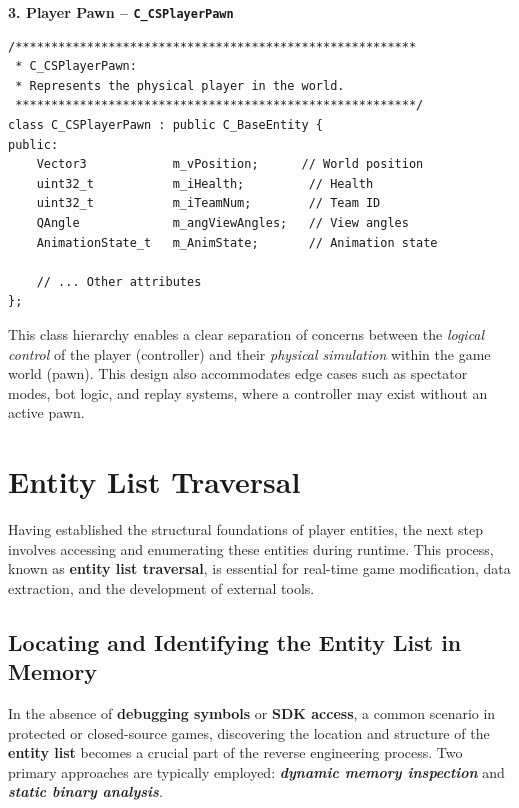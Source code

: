 \noindent\textbf{3. Player Pawn – \texttt{C\_CSPlayerPawn}}

\begin{lstlisting}[style=cppstyle, caption={C\_CSPlayerPawn – In-World Representation of the Player}]
/********************************************************
 * C_CSPlayerPawn:
 * Represents the physical player in the world.
 ********************************************************/
class C_CSPlayerPawn : public C_BaseEntity {
public:
    Vector3            m_vPosition;      // World position
    uint32_t           m_iHealth;         // Health
    uint32_t           m_iTeamNum;        // Team ID
    QAngle             m_angViewAngles;   // View angles
    AnimationState_t   m_AnimState;       // Animation state

    // ... Other attributes
};
\end{lstlisting}


This class hierarchy enables a clear separation of concerns between the \textit{logical control} of the player (controller) and their \textit{physical simulation} within the game world (pawn). This design also accommodates edge cases such as spectator modes, bot logic, and replay systems, where a controller may exist without an active pawn.

\section{Entity List Traversal}

Having established the structural foundations of player entities, the next step involves accessing and enumerating these entities during runtime. This process, known as \textbf{entity list traversal}, is essential for real-time game modification, data extraction, and the development of external tools.

\subsection{Locating and Identifying the Entity List in Memory}

In the absence of \textbf{debugging symbols} or \textbf{SDK access}, a common scenario in protected or closed-source games, discovering the location and structure of the \textbf{entity list} becomes a crucial part of the reverse engineering process. Two primary approaches are typically employed: \textit{\textbf{dynamic memory inspection}} and \textit{\textbf{static binary analysis}}.


